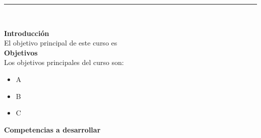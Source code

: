 \documentclass[letterpaper,10pt,onecolumn]{article}
\begin{document}




\noindent\rule{\textwidth}{1pt}\\[-0.1cm]

\addtocounter{mysection}{1}

\noindent\textbf{\large {} \quad Introducci\'on}\\[-0.2cm]


\noindent\normalsize El objetivo principal de este curso es 
\\[0.1cm]

\noindent\textbf{\large {} \quad Objetivos}\\[-0.2cm]

\noindent\normalsize Los objetivos principales del curso son:

\begin{itemize}

	\item A \\[-0.6cm] 
	\item B \\[-0.6cm] 
	\item C \\[-0.2cm] 
\end{itemize}

\noindent\textbf{\large {} \quad Competencias a
  desarrollar}\\[-0.2cm] 

\end{document}

